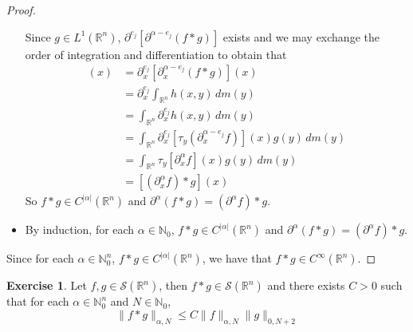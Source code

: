 \documentclass{book}
\theoremstyle{definition}
\newtheorem{ex}[definition]{Exercise}
\newcommand{\al}{\alpha}
\newcommand{\N}{\mathbb{N}}
\newcommand{\R}{\mathbb{R}}
\newcommand{\MS}{\mathcal{S}}
\DeclareMathOperator*{\0}{\mbf{0}}
\DeclareMathOperator*{\1}{\mbf{1}}
\newcommand{\p}{\partial}
\newcommand{\dm}{\, d m}
\begin{document}
\begin{proof}
\begin{itemize}
			Since $g \in L^1(\R^n)$, $\p^{e_j}[\p^{\al-e_j} (f*g)]$ exists and we may exchange the order of integration and differentiation to obtain that
			\begin{align*}
				[\p_x^{\al}(f*g)](x)
				& = \p^{e_j}_x [\p_x^{\al-e_j} (f*g)](x) \\
				& = \p^{e_j}_x \int_{\R^n} h(x,y) \dm(y) \\
				& = \int_{\R^n} \p^{e_j}_x h(x,y) \dm(y) \\
				& = \int_{\R^n} \p^{e_j}_x [\tau_y (\p_x^{\al-e_j} f)](x)g(y) \dm(y) \\
				& = \int_{\R^n} \tau_y [\p_x^{\al} f](x)g(y) \dm(y) \\
				& = [(\p_x^{\al}f)*g](x) 
			\end{align*}
			So $f*g \in C^{|\al|}(\R^n)$ and $\p^{\al}(f*g) = (\p^{\al}f) * g$. 
			\item By induction, for each $\al \in \N_0$, $f*g \in C^{|\al|}(\R^n)$ and $\p^{\al}(f*g) = (\p^{\al}f) * g$.
			\end{itemize}
			 Since for each $\al \in \N_0^n$, $f*g \in C^{|\al|}(\R^n)$, we have that $f*g \in C^{\infty}(\R^n)$.
	\end{proof}

	\begin{ex}
		Let $f, g \in \MS(\R^n)$, then $f *g \in \MS(\R^n)$ and there exists $C >0$ such that for each $\al \in \N_0^n$ and $N \in \N_0$, 
		$$\|f*g\|_{\al,N} \leq C\|f\|_{\al, N} \|g\|_{0, N+2}$$
	\end{ex}
\end{document}

